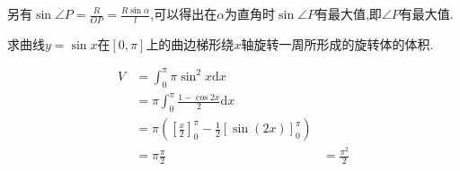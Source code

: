 \begin{questions}
\begin{solution}
		另有$\sin\angle{P} = \frac{R}{OP} =
			\frac{R\sin\alpha}{l}$,可以得出在$\alpha$为直角时$\sin\angle{P}$有最大值,即$\angle{P}$有最大值.
	\end{solution}
	\question 求曲线$y=\sin{x}$在$[0,\pi]$上的曲边梯形绕$x$轴旋转一周所形成的旋转体的体积.
	\begin{solution}
		\begin{align*}
			V & = \int_0^{\pi}\pi \sin^2{x}\mathrm{d}x                              \\
			  & = \pi\int_0^{\pi}\frac{1-\cos{2x}}{2}\mathrm{d}x                    \\
			  & = \pi(\left[\frac{x}{2}\right]_0^{\pi} - \frac12[\sin(2x)]_0^{\pi}) \\
			  & = \pi\frac{\pi}{2}
			  & = \frac{\pi^2}{2}
		\end{align*}
	\end{solution}

\end{questions}
